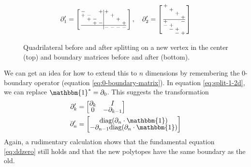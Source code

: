 \documentclass[twocolumn]{article}
\makeatletter
\newenvironment{smallarray}[1]
 {\null\,\vcenter\bgroup\scriptsize
  \renewcommand{\arraystretch}{0.7}%
  \arraycolsep=.13885em
  \hbox\bgroup$\array{@{}#1@{}}}
 {\endarray$\egroup\egroup\,\null}
\makeatother
\begin{document}
\begin{figure}[h]
    \begin{equation*}
        \partial_1' = \left[\begin{smallarray}{cccc|cccc}
            - &   &   & + & + &   &   &   \\
            + & - &   &   &   & + &   &   \\
              & + & - &   &   &   & + &   \\
              &   & + & - &   &   &   & + \\
            \hline
              &   &   &   & - & - & - & -
        \end{smallarray}\right], \quad
        \partial_2' = \left[\begin{smallarray}{cccc}
            + &   &   &   \\
              & + &   &   \\
              &   & + &   \\
              &   &   & + \\
            \hline
            + &   &   & - \\
            - & + &   &   \\
              & - & + &   \\
              &   & - & +
        \end{smallarray}\right]
    \end{equation*}

    \caption{Quadrilateral before and after splitting on a new vertex in the center (top) and boundary matrices before and after (bottom).}
    \label{fig:split-transformation}
\end{figure}

We can get an idea for how to extend this to $n$ dimensions by remembering the 0-boundary operator (equation \eqref{eq:0-boundary-matrix}).
In equation \eqref{eq:split-1-2d}, we can replace $\mathbbm{1}^* = \partial_0$.
This suggests the transformation
\begin{align}
    \partial_k' & = \left[\begin{matrix}\partial_k & I \\ 0 & -\partial_{k - 1}\end{matrix}\right] \label{eq:split-k} \\
    \partial_n' & = \left[\begin{matrix}\text{diag}(\partial_n\cdot\mathbbm{1}) \\ -\partial_{n - 1}\text{diag}(\partial_n\cdot\mathbbm{1})\end{matrix}\right] \label{eq:split-n}
\end{align}
Again, a rudimentary calculation shows that the fundamental equation \eqref{eq:ddzero} still holds and that the new polytopes have the same boundary as the old.
\end{document}
